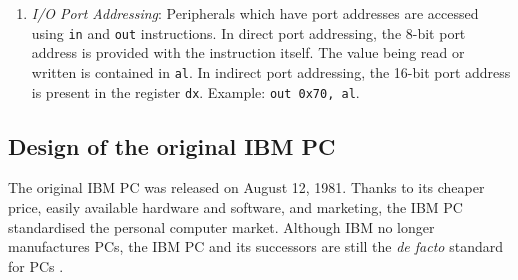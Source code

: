 \begin{enumerate}
  \item \textit{I/O Port Addressing}: Peripherals which have port addresses are accessed using \texttt{in} and \verb|out| instructions. In direct port addressing, the 8-bit port address is provided with the instruction itself. The value being read or written is contained in \verb|al|. In indirect port addressing, the 16-bit port address is present in the register \texttt{dx}. Example: \verb|out 0x70, al|.
\end{enumerate}

\subsection{Design of the original IBM PC}
The original IBM PC was released on August 12, 1981. Thanks to its cheaper price, easily available hardware and software, and marketing, the IBM PC standardised the personal computer market. Although IBM no longer manufactures PCs, the IBM PC and its successors are still the \textit{de facto} standard for PCs \cite{ibmarchpc}.

